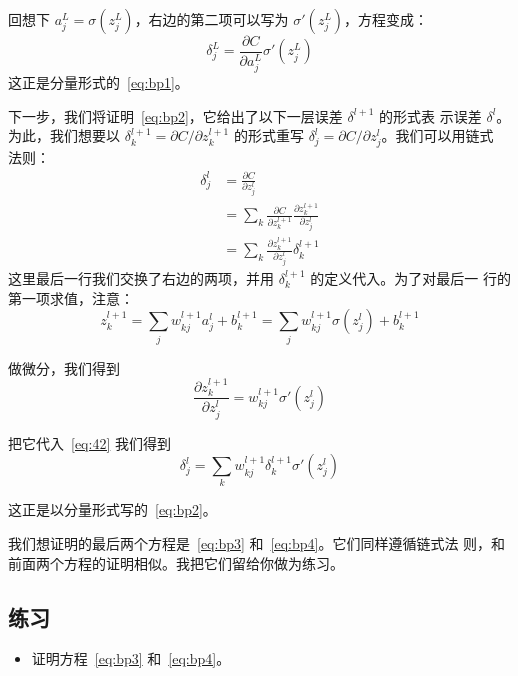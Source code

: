 回想下 $a^L_j = \sigma(z^L_j)$，右边的第二项可以写为 $\sigma'(z^L_j)$，方程变成：
\begin{equation}
  \delta^L_j = \frac{\partial C}{\partial a^L_j} \sigma'(z^L_j)
\label{eq:39}\tag{39}
\end{equation}
这正是分量形式的~\eqref{eq:bp1}。

下一步，我们将证明~\eqref{eq:bp2}，它给出了以下一层误差 $\delta^{l+1}$ 的形式表
示误差 $\delta^l$。为此，我们想要以 $\delta^{l+1}_k = \partial C / \partial
z^{l+1}_k$ 的形式重写 $\delta^l_j = \partial C / \partial z^l_j$。我们可以用链式
法则：
\begin{align}
  \delta^l_j &= \frac{\partial C}{\partial z^l_j} \label{eq:40}\tag{40}\\
             &= \sum_k \frac{\partial C}{\partial z^{l+1}_k} \frac{\partial z^{l+1}_k}{\partial z^l_j} \label{eq:41}\tag{41}\\
             &= \sum_k \frac{\partial z^{l+1}_k}{\partial z^l_j} \delta^{l+1}_k \label{eq:42}\tag{42}
\end{align}
这里最后一行我们交换了右边的两项，并用 $\delta^{l+1}_k$ 的定义代入。为了对最后一
行的第一项求值，注意：
\begin{equation}
  z^{l+1}_k = \sum_j w^{l+1}_{kj} a^l_j +b^{l+1}_k = \sum_j w^{l+1}_{kj} \sigma(z^l_j) +b^{l+1}_k
\label{eq:43}\tag{43}
\end{equation}

做微分，我们得到
\begin{equation}
  \frac{\partial z^{l+1}_k}{\partial z^l_j} = w^{l+1}_{kj} \sigma'(z^l_j)
\label{eq:44}\tag{44}
\end{equation}

把它代入~\eqref{eq:42} 我们得到
\begin{equation}
  \delta^l_j = \sum_k w^{l+1}_{kj}  \delta^{l+1}_k \sigma'(z^l_j)
\label{eq:45}\tag{45}
\end{equation}

这正是以分量形式写的~\eqref{eq:bp2}。

我们想证明的最后两个方程是~\eqref{eq:bp3} 和~\eqref{eq:bp4}。它们同样遵循链式法
则，和前面两个方程的证明相似。我把它们留给你做为练习。

\subsection*{练习}

\begin{itemize}
\item 证明方程~\eqref{eq:bp3} 和~\eqref{eq:bp4}。
\end{itemize}

